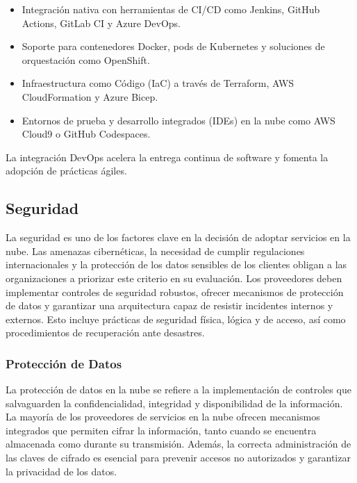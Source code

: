 {                \begin{itemize}
                    \item Integración nativa con herramientas de CI/CD como Jenkins, GitHub Actions, GitLab CI y Azure DevOps.
                    \item Soporte para contenedores Docker, pods de Kubernetes y soluciones de orquestación como OpenShift.
                    \item Infraestructura como Código (IaC) a través de Terraform, AWS CloudFormation y Azure Bicep.
                    \item Entornos de prueba y desarrollo integrados (IDEs) en la nube como AWS Cloud9 o GitHub Codespaces.
                \end{itemize}
                
                La integración DevOps acelera la entrega continua de software y fomenta la adopción de prácticas ágiles.

        \subsection{Seguridad}
            La seguridad es uno de los factores clave en la decisión de adoptar servicios en la nube. Las amenazas cibernéticas, la necesidad de cumplir regulaciones internacionales y la protección de los datos sensibles de los clientes obligan a las organizaciones a priorizar este criterio en su evaluación. Los proveedores deben implementar controles de seguridad robustos, ofrecer mecanismos de protección de datos y garantizar una arquitectura capaz de resistir incidentes internos y externos. Esto incluye prácticas de seguridad física, lógica y de acceso, así como procedimientos de recuperación ante desastres.
            
            \subsubsection{Protección de Datos}
                La protección de datos en la nube se refiere a la implementación de controles que salvaguarden la confidencialidad, integridad y disponibilidad de la información. La mayoría de los proveedores de servicios en la nube ofrecen mecanismos integrados que permiten cifrar la información, tanto cuando se encuentra almacenada como durante su transmisión. Además, la correcta administración de las claves de cifrado es esencial para prevenir accesos no autorizados y garantizar la privacidad de los datos.
                
}
